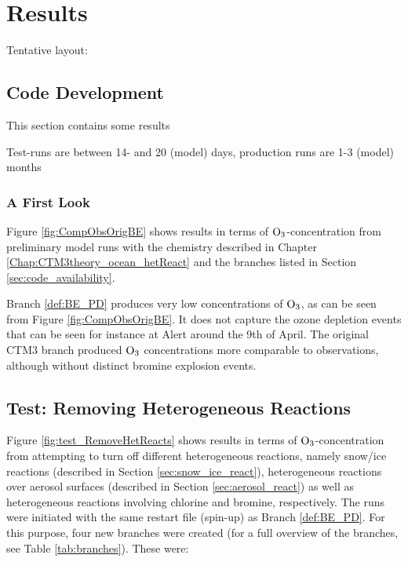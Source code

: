 \setcounter{chapter}{7}
\chapter{Results}\label{chap:results}

Tentative layout: 


\section{Code Development}\label{sec:results_code_development}

This section contains some results 

Test-runs are between 14- and 20 (model) days, production runs are 1-3 (model) months

\subsection{A First Look}

Figure \ref{fig:CompObsOrigBE} shows results in terms of $\mathrm{O_3}$-concentration from preliminary model runs with the chemistry described in Chapter \ref{Chap:CTM3theory_ocean_hetReact} and the branches listed in Section \ref{sec:code_availability}. 

\medskip

Branch \ref{def:BE_PD} produces very low concentrations of $\mathrm{O_3}$, as can be seen from Figure \ref{fig:CompObsOrigBE}. It does not capture the ozone depletion events that can be seen for instance at Alert around the 9th of April. The original CTM3 branch produced $\mathrm{O_3}$ concentrations more comparable to observations, although without distinct bromine explosion events. 




\section{Test: Removing Heterogeneous Reactions}

Figure \ref{fig:test_RemoveHetReacts} shows results in terms of $\mathrm{O_3}$-concentration from attempting to turn off different heterogeneous reactions, namely snow/ice reactions (described in Section \ref{sec:snow_ice_react}), heterogeneous reactions over aerosol surfaces (described in Section \ref{sec:aerosol_react}) as well as heterogeneous reactions involving chlorine and bromine, respectively. The runs were initiated with the same restart file (spin-up) as Branch \ref{def:BE_PD}. For this purpose, four new branches were created (for a full overview of the branches, see Table \ref{tab:branches}). These were:

